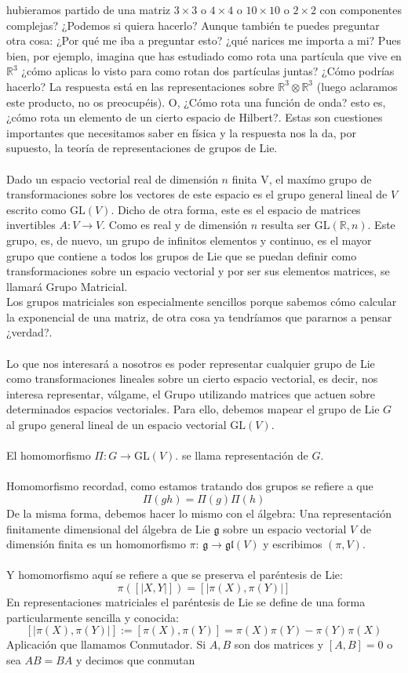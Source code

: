 \documentclass[12pt]{article}
\begin{document}
hubieramos partido de una matriz $3\times3$ o $4\times4 $ o $10 \times 10$ o $2\times 2$ con componentes complejas? ¿Podemos si quiera hacerlo?  Aunque también te puedes preguntar otra cosa:
¿Por qué me iba a preguntar esto? ¿qué narices me importa a mi? Pues bien, por ejemplo, imagina que has estudiado como rota una partícula que vive en $\mathbb{R}^3$ ¿cómo aplicas lo visto para como rotan dos partículas juntas? ¿Cómo podrías hacerlo? La respuesta está en las representaciones sobre $\mathbb{R}^3\otimes \mathbb{R}^3$ (luego aclaramos este producto, no os preocupéis). O, ¿Cómo rota una función de onda? esto es, ¿cómo rota un elemento de un cierto espacio de Hilbert?. Estas son cuestiones importantes que necesitamos saber en física y la respuesta nos la da, por supuesto, la teoría de representaciones de grupos de Lie. \\\\
Dado un espacio vectorial real de dimensión $n$ finita V, el maxímo grupo de transformaciones sobre los vectores de este espacio es el grupo general lineal de $V$ escrito como $\text{GL}(V)$. Dicho de otra forma, este es el espacio de matrices invertibles $A: V\rightarrow V$. Como es real y de dimensión $n$ resulta ser $\text{GL}(\mathbb{R},n)$. Este grupo, es, de nuevo, un grupo de infinitos elementos y continuo, es el mayor grupo que contiene a todos los grupos de Lie que se puedan definir como transformaciones sobre un espacio vectorial y por ser sus elementos matrices, se llamará Grupo Matricial.\\
Los grupos matriciales son especialmente sencillos porque sabemos cómo calcular la exponencial de una matriz, de otra cosa ya tendríamos que pararnos a pensar ¿verdad?.\\\\ 
Lo que nos interesará a nosotros es poder representar cualquier grupo de Lie como transformaciones lineales sobre un cierto espacio vectorial, es decir, nos interesa representar, válgame, el Grupo utilizando matrices que actuen sobre determinados espacios vectoriales. Para ello, debemos mapear el grupo de Lie $G$ al grupo general lineal de un espacio vectorial $\text{GL}(V)$. \\\\
El homomorfismo $\Pi: G\rightarrow\text{GL}(V)$. se llama representación de $G$.\\\\
Homomorfismo recordad, como estamos tratando dos grupos se refiere a que 
$$\Pi (gh)= \Pi(g)\Pi(h)$$ De la misma forma, debemos hacer lo mismo con el álgebra:
Una representación finitamente dimensional del álgebra de Lie $\mathfrak{g}$ sobre un espacio vectorial $V$ de dimensión finita es un homomorfismo $\pi$: $\mathfrak{g}\rightarrow \mathfrak{g}\mathfrak{l}(V)$ y escribimos $(\pi, V)$. \\\\
Y homomorfismo aquí se refiere a que se preserva el paréntesis de Lie:
$$\pi([|X,Y|])=[|\pi(X),\pi(Y)|]$$
En representaciones matriciales el paréntesis de Lie se define de una forma particularmente sencilla y conocida:
$$[|\pi(X),\pi(Y)|]:=[\pi(X),\pi(Y)]=\pi(X)\pi(Y)-\pi(Y)\pi(X)$$
Aplicación que llamamos Conmutador. Si $A,B$ son dos matrices y $[A,B]=0$ o sea $AB=BA$ y decimos que conmutan
\end{document}
